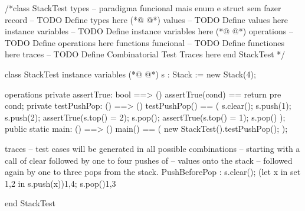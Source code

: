 \begin{vdmpp}[breaklines=true]

/*class StackTest
types -- paradigma funcional mais enum e struct sem fazer record
-- TODO Define types here
(*@
\label{assertTrue:5}
@*)
values
-- TODO Define values here
instance variables
-- TODO Define instance variables here
(*@
\label{testPushPop:9}
@*)
operations
-- TODO Define operations here
functions funcional
-- TODO Define functiones here
traces
-- TODO Define Combinatorial Test Traces here
end StackTest
*/

class StackTest
instance variables
(*@
\label{main:20}
@*)
s : Stack := new Stack(4);



operations
private assertTrue: bool ==> ()
assertTrue(cond) == return
pre cond;
private testPushPop: () ==> ()
testPushPop() ==
(
s.clear();
s.push(1);
s.push(2);
assertTrue(s.top() = 2);
s.pop();
assertTrue(s.top() = 1);
s.pop()
);
public static main: () ==> ()
main() ==
(
new StackTest().testPushPop();
);

traces
-- test cases will be generated in all possible combinations
-- starting with a call of clear followed by one to four pushes of
-- values onto the stack
-- followed again by one to three pops from the stack.
PushBeforePop :
s.clear();
(let x in set {1,2} in s.push(x)){1,4};
s.pop(){1,3}

end StackTest
\end{vdmpp}
